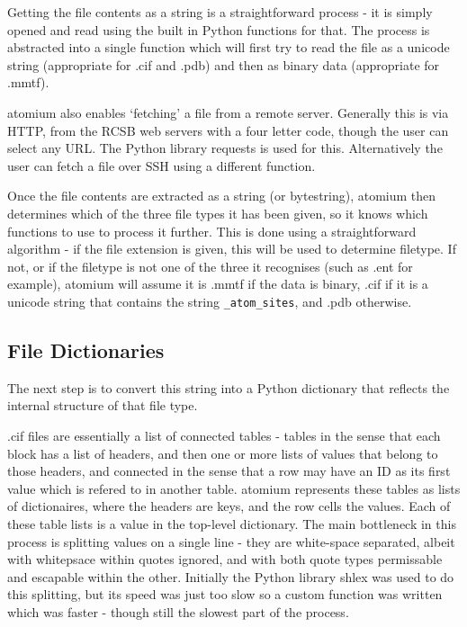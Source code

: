 Getting the file contents as a string is a straightforward process - it is simply opened and read using the built in Python functions for that. The process is abstracted into a single function which will first try to read the file as a unicode string (appropriate for .cif and .pdb) and then as binary data (appropriate for .mmtf).

atomium also enables `fetching' a file from a remote server. Generally this is via HTTP, from the RCSB web servers  with a four letter code, though the user can select any URL. The Python library requests  is used for this. Alternatively the user can fetch a file over SSH using a different function.

Once the file contents are extracted as a string (or bytestring), atomium then determines which of the three file types it has been given, so it knows which functions to use to process it further. This is done using a straightforward algorithm - if the file extension is given, this will be used to determine filetype. If not, or if the filetype is not one of the three it recognises (such as .ent for example), atomium will assume it is .mmtf if the data is binary, .cif if it is a unicode string that contains the string \texttt{\_atom\_sites}, and .pdb otherwise.

\subsection{File Dictionaries}

The next step is to convert this string into a Python dictionary that reflects the internal structure of that file type.

.cif files are essentially a list of connected tables - tables in the sense that each block has a list of headers, and then one or more lists of values that belong to those headers, and connected in the sense that a row may have an ID as its first value which is refered to in another table. atomium represents these tables as lists of dictionaires, where the headers are keys, and the row cells the values. Each of these table lists is a value in the top-level dictionary.  The main bottleneck in this process is splitting values on a single line - they are white-space separated, albeit with whitepsace within quotes ignored, and with both quote types permissable and escapable within the other. Initially the Python library shlex was used to do this splitting, but its speed was just too slow so a custom function was written which was faster - though still the slowest part of the process.

